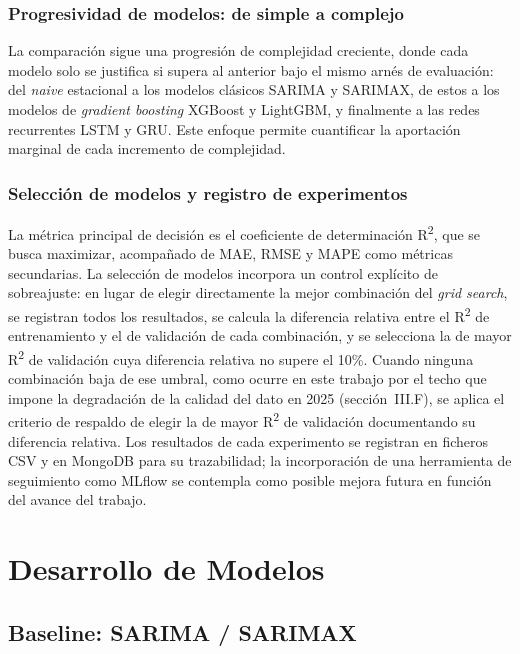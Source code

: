 \documentclass[12pt, a4paper]{article}
\begin{document}
\subsubsection{Progresividad de modelos: de simple a complejo}

La comparación sigue una progresión de complejidad creciente, donde cada modelo solo se justifica si supera al anterior bajo el mismo arnés de evaluación: del \textit{naive} estacional a los modelos clásicos SARIMA y SARIMAX, de estos a los modelos de \textit{gradient boosting} XGBoost y LightGBM, y finalmente a las redes recurrentes LSTM y GRU. Este enfoque permite cuantificar la aportación marginal de cada incremento de complejidad.

\subsubsection{Selección de modelos y registro de experimentos}

La métrica principal de decisión es el coeficiente de determinación R\textsuperscript{2}, que se busca maximizar, acompañado de MAE, RMSE y MAPE como métricas secundarias. La selección de modelos incorpora un control explícito de sobreajuste: en lugar de elegir directamente la mejor combinación del \textit{grid search}, se registran todos los resultados, se calcula la diferencia relativa entre el R\textsuperscript{2} de entrenamiento y el de validación de cada combinación, y se selecciona la de mayor R\textsuperscript{2} de validación cuya diferencia relativa no supere el 10\%. Cuando ninguna combinación baja de ese umbral, como ocurre en este trabajo por el techo que impone la degradación de la calidad del dato en 2025 (sección~III.F), se aplica el criterio de respaldo de elegir la de mayor R\textsuperscript{2} de validación documentando su diferencia relativa. Los resultados de cada experimento se registran en ficheros CSV y en MongoDB para su trazabilidad; la incorporación de una herramienta de seguimiento como MLflow se contempla como posible mejora futura en función del avance del trabajo.

\section{Desarrollo de Modelos}

\subsection{Baseline: SARIMA / SARIMAX}
\end{document}
